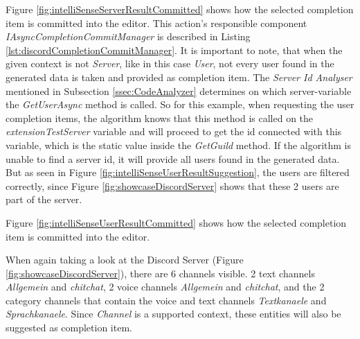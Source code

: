 Figure \ref{fig:intelliSenseServerResultCommitted} shows how the selected completion item is committed into the editor. This action's responsible component \textit{IAsyncCompletionCommitManager} is described in Listing \ref{lst:discordCompletionCommitManager}.
\newpage
{}
It is important to note, that when the given context is not \textit{Server}, like in this case \textit{User}, not every user found in the generated data is taken and provided as completion item. The \textit{Server Id Analyser} mentioned in Subsection \ref{ssec:CodeAnalyzer} determines on which server-variable the \textit{GetUserAsync} method is called. So for this example, when requesting the user completion items, the algorithm knows that this method is called on the \textit{extensionTestServer} variable and will proceed to get the id connected with this variable, which is the static value inside the \textit{GetGuild} method. If the algorithm is unable to find a server id, it will provide all users found in the generated data. But as seen in Figure \ref{fig:intelliSenseUserResultSuggestion}, the users are filtered correctly, since Figure \ref{fig:showcaseDiscordServer} shows that these 2 users are part of the server.

Figure \ref{fig:intelliSenseUserResultCommitted} shows how the selected completion item is committed into the editor.

When again taking a look at the Discord Server (Figure \ref{fig:showcaseDiscordServer}), there are 6 channels visible. 2 text channels \textit{Allgemein} and \textit{chitchat}, 2 voice channels \textit{Allgemein} and \textit{chitchat}, and the 2 category channels that contain the voice and text channels \textit{Textkanaele} and \textit{Sprachkanaele}. 
Since \textit{Channel} is a supported context, these entities will also be suggested as completion item.



